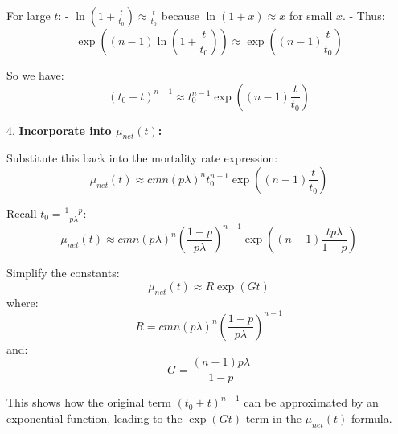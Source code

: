 \documentclass{article}
\begin{document}
   For large $t$:
   - $\ln\left(1 + \frac{t}{t_0}\right) \approx \frac{t}{t_0}$ because $\ln(1 + x) \approx x$ for small $x$.
   - Thus:
     \[
     \exp\left( (n-1) \ln\left(1 + \frac{t}{t_0}\right) \right) \approx \exp\left( (n-1) \frac{t}{t_0} \right)
     \]

   So we have:
   \[
   (t_0 + t)^{n-1} \approx t_0^{n-1} \exp\left( (n-1) \frac{t}{t_0} \right)
   \]

4. \textbf{Incorporate into $\mu_{net}(t)$:}

   Substitute this back into the mortality rate expression:
   \[
   \mu_{net}(t) \approx cmn(p\lambda)^n t_0^{n-1} \exp\left( (n-1) \frac{t}{t_0} \right)
   \]

   Recall $t_0 = \frac{1 - p}{p \lambda}$:
   \[
   \mu_{net}(t) \approx cmn(p\lambda)^n \left( \frac{1 - p}{p \lambda} \right)^{n-1} \exp\left( (n-1) \frac{t p \lambda}{1 - p} \right)
   \]

   Simplify the constants:
   \[
   \mu_{net}(t) \approx R \exp\left( G t \right)
   \]
   where:
   \[
   R = cmn(p\lambda)^n \left( \frac{1 - p}{p \lambda} \right)^{n-1}
   \]
   and:
   \[
   G = \frac{(n-1) p \lambda}{1 - p}
   \]

This shows how the original term $(t_0 + t)^{n-1}$ can be approximated by an exponential function, leading to the $\exp(Gt)$ term in the $\mu_{net}(t)$ formula.
\end{document}
